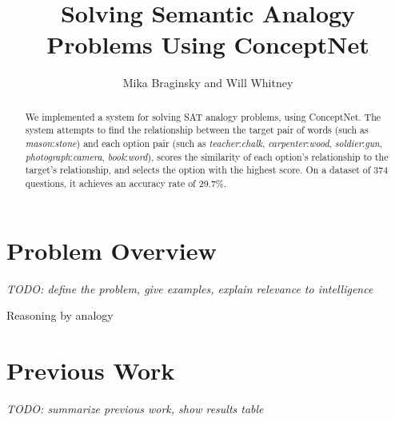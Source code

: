 \documentclass[11pt]{article}
\begin{document}
\title{Solving Semantic Analogy Problems Using ConceptNet}
\author{Mika Braginsky and Will Whitney}
\maketitle

\begin{abstract}
We implemented a system for solving SAT analogy problems, using ConceptNet. The system attempts to find the relationship between the target pair of words (such as \emph{mason}:\emph{stone}) and each option pair (such as \emph{teacher}:\emph{chalk}, \emph{carpenter}:\emph{wood}, \emph{soldier}:\emph{gun}, \emph{photograph}:\emph{camera}, \emph{book}:\emph{word}), scores the similarity of each option's relationship to the target's relationship, and selects the option with the highest score. On a dataset of 374 questions, it achieves an accuracy rate of 29.7\%.
\end{abstract}

\section{Problem Overview}

\textit{TODO: define the problem, give examples, explain relevance to intelligence}

Reasoning by analogy 

\section{Previous Work}

\textit{TODO: summarize previous work, show results table}
\end{document}
